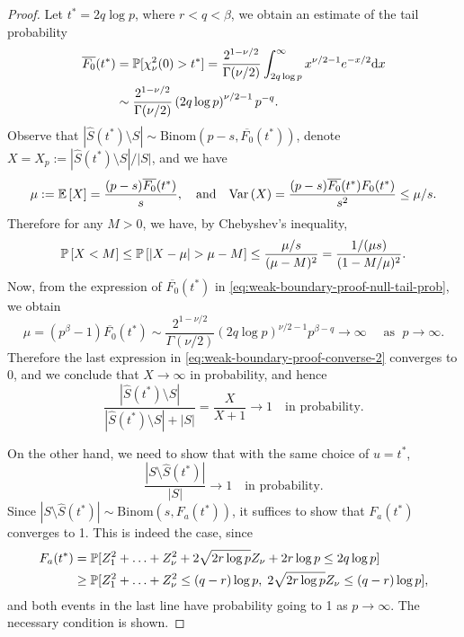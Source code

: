 \begin{proof}
Let $t^* = 2q\log{p}$, where $r<q<\beta$, we obtain an estimate of the tail probability
\begin{align}
    \overline{F_0}(t^*) 
    &= \P[\chi_\nu^2(0) > t^*] 
    = \frac{2^{1-\nu/2}}{\Gamma(\nu/2)} \int_{2q\log{p}}^\infty x^{\nu/2-1}e^{-x/2} \mathrm{d}x \nonumber \\
    &\sim \frac{2^{1-\nu/2}}{\Gamma(\nu/2)} \left(2q\log{p}\right)^{\nu/2-1}p^{-q}. \label{eq:weak-boundary-proof-null-tail-prob}
\end{align}
Observe that $|\widehat{S}(t^*)\setminus{S}| \sim \text{Binom}(p-s, \overline{F_0}(t^*))$, denote $X = X_p := {|\widehat{S}(t^*)\setminus{S}|}/{|S|}$, and we have 
$$
\mu := {\mathbb E}\left[X\right] = \frac{(p-s)\overline{F_0}(t^*)}{s},
\quad \text{and} \quad
{\rm {Var}}\left(X\right) = \frac{(p-s)\overline{F_0}(t^*){F_0}(t^*)}{s^2} \le \mu/s.
$$
Therefore for any $M>0$, we have, by Chebyshev's inequality,
\begin{equation}
    \P\left[X < M\right] 
    \le \P\left[\left|X-\mu\right| > \mu - M\right]
    \le \frac{\mu/s}{(\mu-M)^2}
    = \frac{1/(\mu s)}{(1-M/\mu)^2}. \label{eq:weak-boundary-proof-converse-2}
\end{equation}
Now, from the expression of $\overline{F_0}(t^*)$ in \eqref{eq:weak-boundary-proof-null-tail-prob}, we obtain
$$
\mu = (p^\beta - 1)\overline{F_0}(t^*) \sim \frac{2^{1-\nu/2}}{\Gamma(\nu/2)} \left(2q\log{p}\right)^{\nu/2-1}p^{\beta-q}\to\infty \quad \text{ as }\;p\to\infty.
$$
Therefore the last expression in \eqref{eq:weak-boundary-proof-converse-2} converges to 0, and we conclude that $X\to\infty$ in probability, and hence
$$
\frac{|\widehat{S}(t^*)\setminus{S}|}{|\widehat{S}(t^*)\setminus{S}|+|{S}|} 
= \frac{X}{X+1} \to 1 \quad \text{in probability}.
$$

On the other hand, we need to show that with the same choice of $u = t^*$,
$$
\frac{|{S}\setminus\widehat{S}(t^*)|}{|{S}|}\to 1 \quad \text{in probability}.
$$
Since $|{S}\setminus\widehat{S}(t^*)| \sim \text{Binom}(s, {F_a}(t^*))$, it suffices to show that ${F_a}(t^*)$ converges to 1.
This is indeed the case, since
\begin{align}
    {F_a}(t^*) 
    &= \P[Z_1^2 + \ldots + Z_\nu^2 + 2\sqrt{2r\log{p}} Z_\nu + 2r\log{p} \le 2q\log{p}] \\
    &\ge \P[Z_1^2 + \ldots + Z_\nu^2 \le (q-r)\log{p}, \; 2\sqrt{2r\log{p}} Z_\nu \le (q-r)\log{p}],
\end{align}
and both events in the last line have probability going to 1 as $p\to\infty$.
The necessary condition is shown.


\end{proof}
